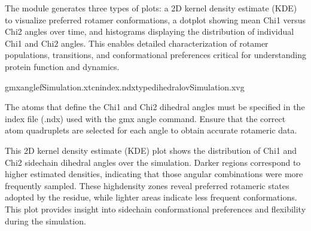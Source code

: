 \documentclass[a4paper,10pt,english]{sphinxmanual}
\let\sphinxpxdimen\pdfpxdimen\else\newdimen\sphinxpxdimen
\begin{document}
\sphinxAtStartPar
The module generates three types of plots: a 2D kernel density estimate (KDE) to visualize preferred rotamer conformations, a dotplot showing mean Chi1 versus Chi2 angles over time, and histograms displaying the distribution of individual Chi1 and Chi2 angles. This enables detailed characterization of rotamer populations, transitions, and conformational preferences critical for understanding protein function and dynamics.

\sphinxAtStartPar
{}

\begin{sphinxVerbatim}[commandchars=\\\{\}]
gmxangle\PYGZhy{}fSimulation.xtc\PYGZhy{}nindex.ndx\PYGZhy{}typedihedral\PYGZhy{}ovSimulation.xvg
\end{sphinxVerbatim}

\sphinxAtStartPar
{} The atoms that define the Chi1 and Chi2 dihedral angles must be specified in the index file (.ndx) used with the gmx angle command. Ensure that the correct atom quadruplets are selected for each angle to obtain accurate rotameric data.

\begin{sphinxVerbatim}[commandchars=\\\{\}]
    
\end{sphinxVerbatim}

\noindent{\hspace*{\fill}\sphinxincludegraphics[width=600\sphinxpxdimen]{{Kde2d}.png}\hspace*{\fill}}

\sphinxAtStartPar
{} This 2D kernel density estimate (KDE) plot shows the distribution of Chi1 and Chi2 side\sphinxhyphen{}chain dihedral angles over the simulation. Darker regions correspond to higher estimated densities, indicating that those angular combinations were more frequently sampled. These high\sphinxhyphen{}density zones reveal preferred rotameric states adopted by the residue, while lighter areas indicate less frequent conformations. This plot provides insight into side\sphinxhyphen{}chain conformational preferences and flexibility during the simulation.
\end{document}
